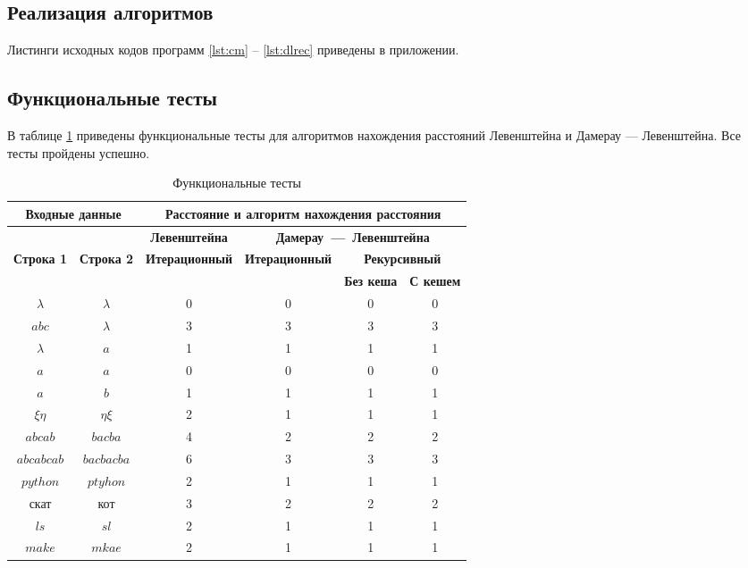 \subsection{Реализация алгоритмов}

Листинги исходных кодов программ \ref{lst:cm} -- \ref{lst:dlrec} приведены в приложении.

\subsection{Функциональные тесты}

В таблице \ref{tab:ft} приведены функциональные тесты для алгоритмов нахождения расстояний Левенштейна и Дамерау --- Левенштейна. Все тесты пройдены успешно.

\begin{table}[H]
	\small
	\begin{center}
		\begin{threeparttable}
		\caption{Функциональные тесты}
		\label{tab:ft}
		\begin{tabular}{|c|c|c|c|c|c|}
			\hline
			\multicolumn{2}{|c|}{\bfseries Входные данные}
			& \multicolumn{4}{c|}{\bfseries Расстояние и алгоритм нахождения расстояния} \\ 
			\hline 
			&
			& \multicolumn{1}{c|}{\bfseries Левенштейна} 
			& \multicolumn{3}{c|}{\bfseries Дамерау~---~Левенштейна} \\ \cline{3-6}
			
			\bfseries Строка 1 & \bfseries Строка 2 & \bfseries Итерационный & \bfseries Итерационный
			
			& \multicolumn{2}{c|}{\bfseries Рекурсивный} \\ \cline{5-6}
			& & & & \bfseries Без кеша & \bfseries С кешем \\
			\hline
			$\lambda$ & $\lambda$ & 0 & 0 & 0 & 0 \\
			\hline
			$abc$ & $\lambda$ & 3 & 3 & 3 & 3 \\
			\hline
			$\lambda$ & $a$ & 1 & 1 & 1 & 1 \\
			\hline
			$a$ & $a$ & 0 & 0 & 0 & 0 \\
			\hline
			$a$ & $b$ & 1 & 1 & 1 & 1 \\
			\hline
			$\xi\eta$ & $\eta\xi$ & 2 & 1 & 1 & 1 \\
			\hline
			$abcab$ & $bacba$ & 4 & 2 & 2 & 2 \\
			\hline
			$abcabcab$ & $bacbacba$ & 6 & 3 & 3 & 3 \\
			\hline
			$python$ & $ptyhon$ & 2 & 1 & 1 & 1 \\
			\hline
			скат & кот & 3 & 2 & 2 & 2 \\
			\hline
			$ls$ & $sl$ & 2 & 1 & 1 & 1 \\
			\hline
			$make$ & $mkae$ & 2 & 1 & 1 & 1 \\
			\hline
		\end{tabular}	
		\end{threeparttable}
	\end{center}
\end{table}

